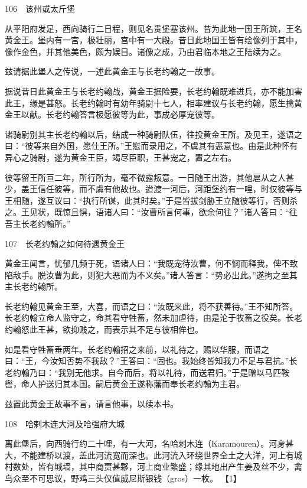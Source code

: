 \documentclass[12pt,UTF8]{ctexbook}
\begin{document}
106　该州或太斤堡

从平阳府发足，西向骑行二日程，则见名贵堡塞该州。昔为此地一国王所筑，王名黄金王。堡内有一宫，极壮丽，宫中有一大殿。昔日此地国王皆有绘像列于其中，像作金色，并其他美色，颇为娱目。诸像之成，乃由君临本地之王陆续为之。

兹请据此堡人之传说，一述此黄金王与长老约翰之一故事。

据说昔日此黄金王与长老约翰战，黄金王据险要，长老约翰既难进兵，亦不能加害此王，缘是甚怒。长老约翰时有幼年骑尉十七人，相率建议与长老约翰，愿生擒黄金王以献。长老约翰答言极愿彼等为此，事成必厚宠彼等。

诸骑尉别其主长老约翰以后，结成一种骑尉队伍，往投黄金王所。及见王，遂语之曰：“彼等来自外国，愿仕王所。”王慰而录用之，不虞其有恶意也。由是此种怀有异心之骑尉，遂为黄金王臣，竭尽臣职，王甚宠之，置之左右。

彼等留王所亘二年，所行所为，毫不微露叛意。一日随王出游，其他扈从之人甚少，盖王信任彼等，而不虞有他故也。迨渡一河后，河距堡约有一哩，时仅彼等与王相随，遂互议曰：“执行所谋，此其时矣。”于是皆拔剑胁王立随彼等行，否则杀之。王见状，既惊且惧，语诸人曰：“汝曹所言何事，欲余何往？”诸人答曰：“往吾主长老约翰所。”





107　长老约翰之如何待遇黄金王

黄金王闻言，忧郁几频于死，语诸人曰：“我既宠待汝曹，何不悯而释我，俾不致陷敌手。脱汝曹为此，则犯大恶而为不义矣。”诸人答言：“势必出此。”遂拘之至其主长老约翰所。

长老约翰见黄金王至，大喜，而语之曰：“汝既来此，将不获善待。”王不知所答。长老约翰立命人监守之，命其看守牲畜，然未加虐待，由是沦于牧畜之役矣。长老约翰怒此王甚，欲抑贱之，而表示其不足与彼相侔也。

如是看守牲畜垂两年。长老约翰招之来前，以礼待之，赐以华服，而语之曰：“王，今汝知否势不我敌？”王答曰：“固也。我始终皆知我力不足与君抗。”长老约翰乃曰：“我别无他求。自今而后，将以礼待，而送君归。”于是赠以马匹鞍辔，命人护送归其本国。嗣后黄金王遂称藩而奉长老约翰为主君。

兹置此黄金王故事不言，请言他事，以续本书。





108　哈剌木连大河及哈强府大城

离此堡后，向西骑行约二十哩，有一大河，名哈剌木连（Karamouren）。河身甚大，不能建桥以渡，盖此河流宽而深也。此河流入环绕世界全土之大洋，河上有城村数处，皆有城墙，其中商贾甚夥，河上商业繁盛；缘其地出产生姜及丝不少，禽鸟众至不可思议，野鸡三头仅值威尼斯银钱（gros）一枚。 【1】
\end{document}
